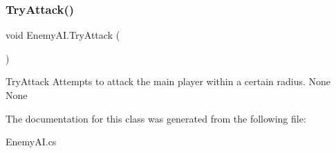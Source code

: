 \subsubsection{\texorpdfstring{Try\+Attack()}{TryAttack()}}
{\footnotesize\ttfamily void Enemy\+A\+I.\+Try\+Attack (\begin{DoxyParamCaption}{ }\end{DoxyParamCaption})\hspace{0.3cm}{\ttfamily [inline]}}

Try\+Attack Attempts to attack the main player within a certain radius.  None  None 

The documentation for this class was generated from the following file\+:\begin{DoxyCompactItemize}
\item 
Enemy\+A\+I.\+cs\end{DoxyCompactItemize}
